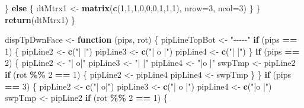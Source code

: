 \documentclass[
]{article}
\newenvironment{Shaded}{\begin{snugshade}}{\end{snugshade}}
\newcommand{\AttributeTok}[1]{\textcolor[rgb]{0.13,0.29,0.53}{#1}}
\newcommand{\ControlFlowTok}[1]{\textcolor[rgb]{0.13,0.29,0.53}{\textbf{#1}}}
\newcommand{\DecValTok}[1]{\textcolor[rgb]{0.00,0.00,0.81}{#1}}
\newcommand{\FunctionTok}[1]{\textcolor[rgb]{0.13,0.29,0.53}{\textbf{#1}}}
\newcommand{\NormalTok}[1]{#1}
\newcommand{\OtherTok}[1]{\textcolor[rgb]{0.56,0.35,0.01}{#1}}
\newcommand{\SpecialCharTok}[1]{\textcolor[rgb]{0.81,0.36,0.00}{\textbf{#1}}}
\newcommand{\StringTok}[1]{\textcolor[rgb]{0.31,0.60,0.02}{#1}}
\begin{document}
\begin{Shaded}
\begin{Highlighting}[]
\NormalTok{    \} }\ControlFlowTok{else}\NormalTok{ \{}
\NormalTok{      dtMtrx1 }\OtherTok{\textless{}{-}} \FunctionTok{matrix}\NormalTok{(}\FunctionTok{c}\NormalTok{(}\DecValTok{1}\NormalTok{,}\DecValTok{1}\NormalTok{,}\DecValTok{1}\NormalTok{,}\DecValTok{0}\NormalTok{,}\DecValTok{0}\NormalTok{,}\DecValTok{0}\NormalTok{,}\DecValTok{1}\NormalTok{,}\DecValTok{1}\NormalTok{,}\DecValTok{1}\NormalTok{), }\AttributeTok{nrow=}\DecValTok{3}\NormalTok{, }\AttributeTok{ncol=}\DecValTok{3}\NormalTok{)}
\NormalTok{    \}}
\NormalTok{  \}}
  \FunctionTok{return}\NormalTok{(dtMtrx1)}
\NormalTok{\}}

\NormalTok{dispTpDwnFace }\OtherTok{\textless{}{-}} 
  \ControlFlowTok{function}\NormalTok{ (pips, rot) \{}
\NormalTok{    pipLineTopBot }\OtherTok{\textless{}{-}} \StringTok{"{-}{-}{-}{-}{-}"}
    \ControlFlowTok{if}\NormalTok{ (pips }\SpecialCharTok{==} \DecValTok{1}\NormalTok{) \{}
\NormalTok{      pipLine2 }\OtherTok{\textless{}{-}} \FunctionTok{c}\NormalTok{(}\StringTok{"|   |"}\NormalTok{)}
\NormalTok{      pipLine3 }\OtherTok{\textless{}{-}} \FunctionTok{c}\NormalTok{(}\StringTok{"| o |"}\NormalTok{)}
\NormalTok{      pipLine4 }\OtherTok{\textless{}{-}} \FunctionTok{c}\NormalTok{(}\StringTok{"|   |"}\NormalTok{)}
\NormalTok{    \}}
    \ControlFlowTok{if}\NormalTok{ (pips }\SpecialCharTok{==} \DecValTok{2}\NormalTok{) \{}
\NormalTok{      pipLine2 }\OtherTok{\textless{}{-}} \StringTok{"|  o|"}
\NormalTok{      pipLine3 }\OtherTok{\textless{}{-}} \StringTok{"|   |"}
\NormalTok{      pipLine4 }\OtherTok{\textless{}{-}} \StringTok{"|o  |"}
\NormalTok{      swpTmp }\OtherTok{\textless{}{-}}\NormalTok{ pipLine2}
      \ControlFlowTok{if}\NormalTok{ (rot }\SpecialCharTok{\%\%} \DecValTok{2} \SpecialCharTok{==} \DecValTok{1}\NormalTok{) \{}
\NormalTok{        pipLine2 }\OtherTok{\textless{}{-}}\NormalTok{ pipLine4}
\NormalTok{        pipLine4 }\OtherTok{\textless{}{-}}\NormalTok{ swpTmp}
\NormalTok{      \}}
\NormalTok{    \}}
    \ControlFlowTok{if}\NormalTok{ (pips }\SpecialCharTok{==} \DecValTok{3}\NormalTok{) \{}
\NormalTok{      pipLine2 }\OtherTok{\textless{}{-}} \FunctionTok{c}\NormalTok{(}\StringTok{"|  o|"}\NormalTok{)}
\NormalTok{      pipLine3 }\OtherTok{\textless{}{-}} \FunctionTok{c}\NormalTok{(}\StringTok{"| o |"}\NormalTok{)}
\NormalTok{      pipLine4 }\OtherTok{\textless{}{-}} \FunctionTok{c}\NormalTok{(}\StringTok{"|o  |"}\NormalTok{)}
\NormalTok{      swpTmp }\OtherTok{\textless{}{-}}\NormalTok{ pipLine2}
      \ControlFlowTok{if}\NormalTok{ (rot }\SpecialCharTok{\%\%} \DecValTok{2} \SpecialCharTok{==} \DecValTok{1}\NormalTok{) \{}

\end{Highlighting}
\end{Shaded}
\end{document}
